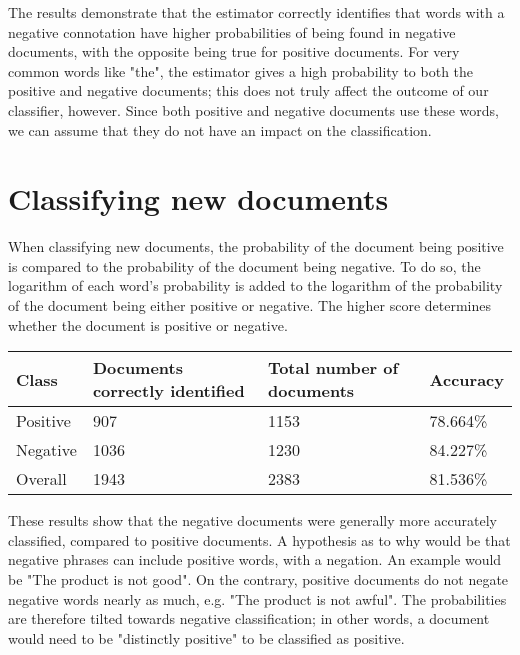 \documentclass[]{llncs}
\begin{document}
The results demonstrate that the estimator correctly identifies that words with a negative connotation have higher probabilities of being found in negative documents, with the opposite being true for positive documents. For very common words like "the", the estimator gives a high probability to both the positive and negative documents; this does not truly affect the outcome of our classifier, however. Since both positive and negative documents use these words, we can assume that they do not have an impact on the classification.

\section{Classifying new documents}
When classifying new documents, the probability of the document being positive is compared to the probability of the document being negative. To do so, the logarithm of each word's probability is added to the logarithm of the probability of the document being either positive or negative. The higher score determines whether the document is positive or negative.

\begin{table}
\begin{tabular}{|l|l|l|l|}
\hline
Class & Documents correctly identified & Total number of documents & Accuracy\\
\hline
Positive & 907 & 1153 & 78.664\%\\
\hline
Negative & 1036 & 1230 & 84.227\%\\
\hline
Overall & 1943 & 2383 & 81.536\%\\
\hline
\end{tabular}
\end{table}

These results show that the negative documents were generally more accurately classified, compared to positive documents. A hypothesis as to why would be that negative phrases can include positive words, with a negation. An example would be "The product is not good". On the contrary, positive documents do not negate negative words nearly as much, e.g. "The product is not awful". The probabilities are therefore tilted towards negative classification; in other words, a document would need to be "distinctly positive" to be classified as positive.
\end{document}
